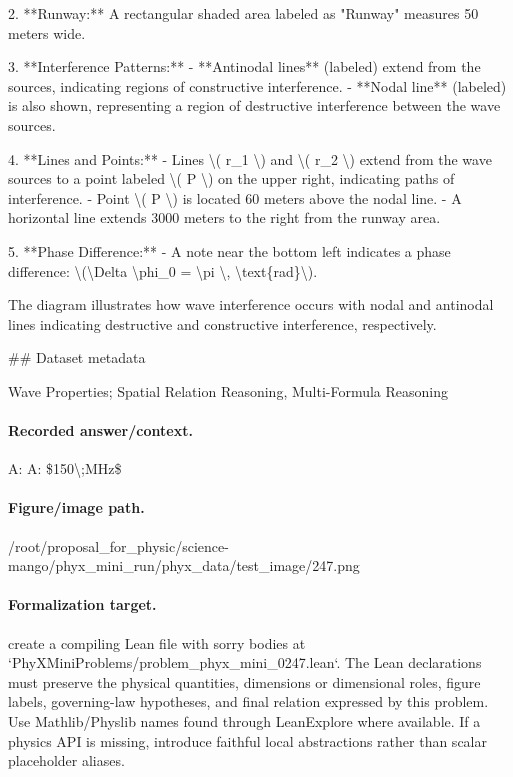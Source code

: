 2. **Runway:** A rectangular shaded area labeled as "Runway" measures 50 meters wide.

3. **Interference Patterns:** 
   - **Antinodal lines** (labeled) extend from the sources, indicating regions of constructive interference.
   - **Nodal line** (labeled) is also shown, representing a region of destructive interference between the wave sources.

4. **Lines and Points:**
   - Lines \textbackslash{}( r\_1 \textbackslash{}) and \textbackslash{}( r\_2 \textbackslash{}) extend from the wave sources to a point labeled \textbackslash{}( P \textbackslash{}) on the upper right, indicating paths of interference.
   - Point \textbackslash{}( P \textbackslash{}) is located 60 meters above the nodal line.
   - A horizontal line extends 3000 meters to the right from the runway area.

5. **Phase Difference:**
   - A note near the bottom left indicates a phase difference: \textbackslash{}(\textbackslash{}Delta \textbackslash{}phi\_0 = \textbackslash{}pi \textbackslash{}, \textbackslash{}text\{rad\}\textbackslash{}).

The diagram illustrates how wave interference occurs with nodal and antinodal lines indicating destructive and constructive interference, respectively.

\#\# Dataset metadata

Wave Properties; Spatial Relation Reasoning, Multi-Formula Reasoning

\paragraph{Recorded answer/context.}
A: A: \$150\textbackslash{};MHz\$

\paragraph{Figure/image path.}
/root/proposal\_for\_physic/science-mango/phyx\_mini\_run/phyx\_data/test\_image/247.png

\paragraph{Formalization target.}
create a compiling Lean file with sorry bodies at `PhyXMiniProblems/problem\_phyx\_mini\_0247.lean`. The Lean declarations must preserve the physical quantities, dimensions or dimensional roles, figure labels, governing-law hypotheses, and final relation expressed by this problem.
Use Mathlib/Physlib names found through LeanExplore where available. If a physics API is missing, introduce faithful local abstractions rather than scalar placeholder aliases.

